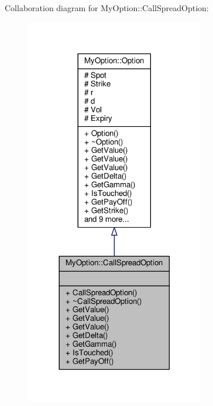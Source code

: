 Collaboration diagram for My\+Option\+:\+:Call\+Spread\+Option\+:
\nopagebreak
\begin{figure}[H]
\begin{center}
\leavevmode
\includegraphics[width=221pt]{classMyOption_1_1CallSpreadOption__coll__graph}
\end{center}
\end{figure}
